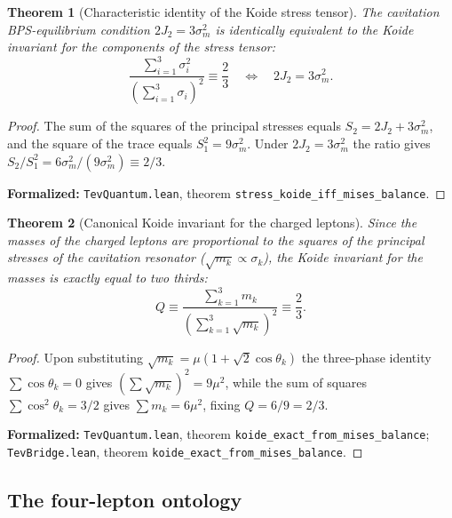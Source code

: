 \documentclass[11pt,a4paper]{article}
\newtheorem{theorem}{Theorem}
\theoremstyle{definition}
\theoremstyle{remark}
\begin{document}
\begin{theorem}[Characteristic identity of the Koide stress tensor]
\label{thm:stress_koide_identity}
The cavitation BPS-equilibrium condition $2J_2 = 3\sigma_m^2$ is identically equivalent to the Koide invariant for the components of the stress tensor:
\begin{equation}
    \frac{\sum_{i=1}^3 \sigma_i^2}{\left(\sum_{i=1}^3 \sigma_i\right)^2} \equiv \frac{2}{3} \quad \Longleftrightarrow \quad 2 J_2 = 3 \sigma_m^2.
    \label{eq:stress_tensor_koide_exact}
\end{equation}
\end{theorem}
\begin{proof}
The sum of the squares of the principal stresses equals $S_2 = 2J_2 + 3\sigma_m^2$, and the square of the trace equals $S_1^2 = 9\sigma_m^2$. Under $2J_2 = 3\sigma_m^2$ the ratio gives $S_2 / S_1^2 = 6\sigma_m^2 / (9\sigma_m^2) \equiv 2/3$.

\noindent\small\textbf{Formalized:} \texttt{TevQuantum.lean}, theorem \texttt{stress_koide_iff_mises_balance}.
\end{proof}

\begin{theorem}[Canonical Koide invariant for the charged leptons]
\label{thm:koide_exact_derivation}
Since the masses of the charged leptons are proportional to the squares of the principal stresses of the cavitation resonator ($\sqrt{m_k} \propto \sigma_k$), the Koide invariant for the masses is exactly equal to two thirds:
\begin{equation}
    Q \equiv \frac{\sum_{k=1}^3 m_k}{\left(\sum_{k=1}^3 \sqrt{m_k}\right)^2} \equiv \frac{2}{3}.
    \label{eq:koide_canonical_two_thirds}
\end{equation}
\end{theorem}
\begin{proof}
Upon substituting $\sqrt{m_k} = \mu(1 + \sqrt{2}\cos\theta_k)$ the three-phase identity $\sum \cos\theta_k = 0$ gives $(\sum \sqrt{m_k})^2 = 9\mu^2$, while the sum of squares $\sum \cos^2\theta_k = 3/2$ gives $\sum m_k = 6\mu^2$, fixing $Q = 6/9 = 2/3$.

\noindent\small\textbf{Formalized:} \texttt{TevQuantum.lean}, theorem \texttt{koide_exact_from_mises_balance}; \texttt{TevBridge.lean}, theorem \texttt{koide_exact_from_mises_balance}.
\end{proof}
\subsection{The four-lepton ontology}
\end{document}
